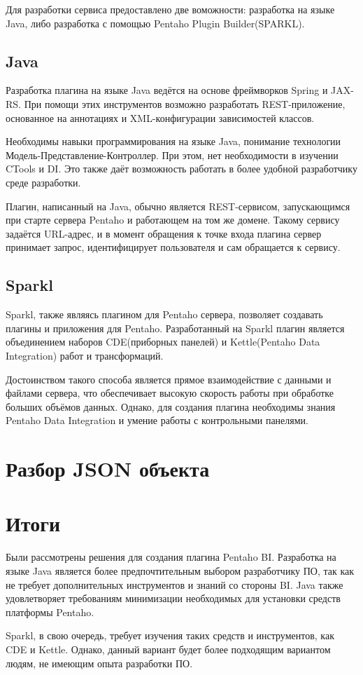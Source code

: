 Для разработки сервиса предоставлено две воможности: разработка на языке Java, либо разработка с помощью Pentaho Plugin Builder(SPARKL).

\subsection{Java}

Разработка плагина на языке Java ведётся на основе фреймворков Spring и JAX-RS. При помощи этих инструментов возможно разработать REST-приложение, основанное на аннотациях и XML-конфигурации зависимостей классов. 

Необходимы навыки программирования на языке Java, понимание технологии Модель-Представление-Контроллер. При этом, нет необходимости в изучении CTools и DI. Это также даёт возможность работать в более удобной разработчику среде разработки.

Плагин, написанный на Java, обычно является REST-сервисом, запускающимся при старте сервера Pentaho и работающем на том же домене. Такому сервису задаётся URL-адрес, и в момент обращения к точке входа плагина сервер принимает запрос, идентифицирует пользователя и сам обращается к сервису.

\subsection{Sparkl}

Sparkl, также являясь плагином для Pentaho сервера, позволяет создавать плагины и приложения для Pentaho. Разработанный на Sparkl плагин является объединением наборов CDE(приборных панелей) и Kettle(Pentaho Data Integration) работ и трансформаций. 

Достоинством такого способа является прямое взаимодействие с данными и файлами сервера, что обеспечивает высокую скорость работы при обработке больших объёмов данных. Однако, для создания плагина необходимы знания Pentaho Data Integration и умение работы с контрольными панелями.

\section{Разбор JSON объекта}



\section{Итоги}

Были рассмотрены решения для создания плагина Pentaho BI. Разработка на языке Java является более предпочтительным выбором разработчику ПО, так как не требует дополнительных инструментов и знаний со стороны BI. Java также удовлетворяет требованиям минимизации необходимых для установки средств платформы Pentaho. 

Sparkl, в свою очередь, требует изучения таких средств и инструментов, как CDE и Kettle. Однако, данный вариант будет более подходящим вариантом людям, не имеющим опыта разработки ПО.

